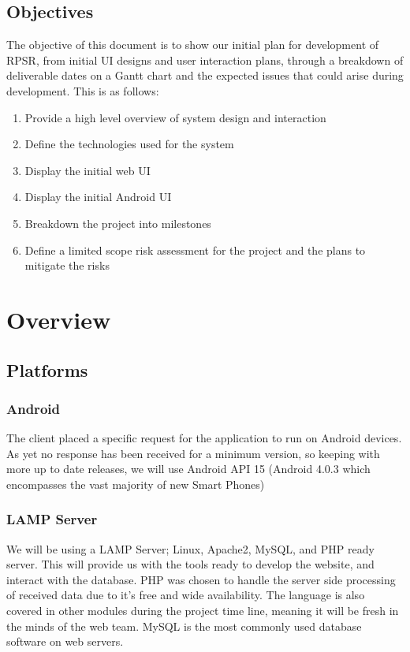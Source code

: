 \documentclass[11pt, titlepage]{article}
\begin{document}
		\subsection{Objectives}
			The objective of this document is to show our initial plan for development of RPSR, from initial UI designs and user interaction plans, through a breakdown of deliverable dates on a Gantt chart and the expected issues that could arise during development. This is as follows:
			\begin{enumerate}
			\item Provide a high level overview of system design and interaction
			\item Define the technologies used for the system
			\item Display the initial web UI
			\item Display the initial Android UI
			\item Breakdown the project into milestones
			\item Define a limited scope risk assessment for the project and the plans to mitigate the risks
			\end{enumerate}
	\section{Overview}
		\subsection{Platforms}
			\subsubsection{Android}
				The client placed a specific request for the application to run on Android devices. As yet no response has been received for a minimum version, so keeping with more up to date releases, we will use Android API 15 (Android 4.0.3 which encompasses the vast majority of new Smart Phones)
			\subsubsection{LAMP Server}
				We will be using a LAMP Server; Linux, Apache2, MySQL, and PHP ready server. This will provide us with the tools ready to develop the website, and interact with the database.
				PHP was chosen to handle the server side processing of received data due to it's free and wide availability. The language is also covered in other modules during the project time line, meaning it will be fresh in the minds of the web team.
				MySQL is the most commonly used database software on web servers.
		\clearpage
\end{document}

